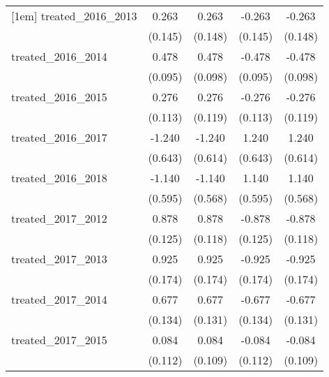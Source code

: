 {\begin{tabular}{l*{4}{c}}
[1em]
treated\_2016\_2013&       0.263         &       0.263         &      -0.263         &      -0.263         \\
            &     (0.145)         &     (0.148)         &     (0.145)         &     (0.148)         \\
[1em]
treated\_2016\_2014&       0.478\sym{***}&       0.478\sym{***}&      -0.478\sym{***}&      -0.478\sym{***}\\
            &     (0.095)         &     (0.098)         &     (0.095)         &     (0.098)         \\
[1em]
treated\_2016\_2015&       0.276\sym{*}  &       0.276\sym{*}  &      -0.276\sym{*}  &      -0.276\sym{*}  \\
            &     (0.113)         &     (0.119)         &     (0.113)         &     (0.119)         \\
[1em]
treated\_2016\_2017&      -1.240         &      -1.240\sym{*}  &       1.240         &       1.240\sym{*}  \\
            &     (0.643)         &     (0.614)         &     (0.643)         &     (0.614)         \\
[1em]
treated\_2016\_2018&      -1.140         &      -1.140\sym{*}  &       1.140         &       1.140\sym{*}  \\
            &     (0.595)         &     (0.568)         &     (0.595)         &     (0.568)         \\
[1em]
treated\_2017\_2012&       0.878\sym{***}&       0.878\sym{***}&      -0.878\sym{***}&      -0.878\sym{***}\\
            &     (0.125)         &     (0.118)         &     (0.125)         &     (0.118)         \\
[1em]
treated\_2017\_2013&       0.925\sym{***}&       0.925\sym{***}&      -0.925\sym{***}&      -0.925\sym{***}\\
            &     (0.174)         &     (0.174)         &     (0.174)         &     (0.174)         \\
[1em]
treated\_2017\_2014&       0.677\sym{***}&       0.677\sym{***}&      -0.677\sym{***}&      -0.677\sym{***}\\
            &     (0.134)         &     (0.131)         &     (0.134)         &     (0.131)         \\
[1em]
treated\_2017\_2015&       0.084         &       0.084         &      -0.084         &      -0.084         \\
            &     (0.112)         &     (0.109)         &     (0.112)         &     (0.109)         \\

\end{tabular}}
